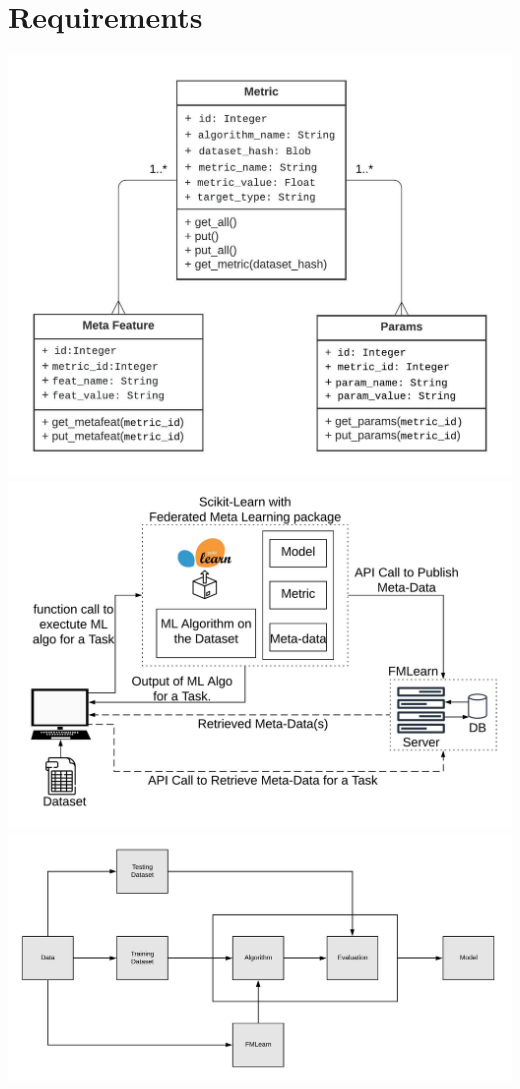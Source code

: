 \section{Requirements}
\includegraphics{images/Class Diagram.jpeg}
\includegraphics{images/FML Architecture Diagram.jpeg}
\includegraphics{images/FML Workflow.jpeg}
